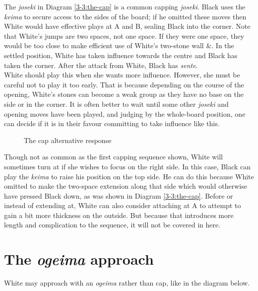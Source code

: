 \documentclass[a5paper,12pt,twoside]{book} %
\newcounter{joseki}                 %
\newcommand{\dref}[1]{Diagram \ref{#1}}
\begin{document}
The \textit{joseki} in \dref{3-3:the-cap} is a common capping \textit{joseki}. Black uses the \textit{keima} to secure access to the sides of the board; if he omitted these moves then White would have effective plays at A and B, sealing Black into the corner. Note that White's jumps are two spaces, not one space. If they were one space, they would be too close to make efficient use of White's two-stone wall{\large\whitestone[1]} \&{\large\whitestone[3]}. In the settled position, White has taken influence towards the centre and Black has taken the corner. After the attack from White, Black has \textit{sente}.\\

White should play this when she wants more influence. However, she must be careful not to play it too early. That is because depending on the course of the opening, White's stones can become a weak group as they have no base on the side or in the corner. It is often better to wait until some other \textit{joseki} and opening moves have been played, and judging by the whole-board position, one can decide if it is in their favour committing to take influence like this.\\

\begin{figure}[!htbp]

\vspace{-0.6cm}\caption{The cap alternative response}
\label{3-3:the-cap-full}
\end{figure}

Though not as common as the first capping sequence shown, White will sometimes turn at{\large\whitestone[5]} if she wishes to focus on the right side. In this case, Black can play the \textit{keima}{\large\blackstone[6]} to raise his position on the top side. He can do this because White omitted to make the two-space extension along that side which would otherwise have pressed Black down, as was shown in \dref{3-3:the-cap}. Before or instead of extending at{\large\whitestone[7]}, White can also consider attaching at A to attempt to gain a bit more thickness on the outside. But because that introduces more length and complication to the sequence, it will not be covered in here.\\

\section{The \textit{ogeima} approach}

White may approach with an \textit{ogeima} rather than cap, like in the diagram below.
\end{document}
